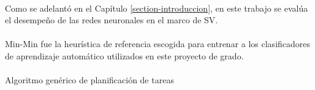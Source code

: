 \paragraph{}Como se adelantó en el Capítulo \ref{section-introduccion}, en este trabajo se evalúa el desempeño de las redes neuronales en el marco de SV.

\paragraph{} Min-Min fue la heurística de referencia escogida para entrenar a los clasificadores de aprendizaje automático utilizados en este proyecto de grado.
 
 
 \paragraph{}
 \SetEndCharOfAlgoLine{}
 \begin{algorithm}[H]
\SetAlgoLined
{}
 \caption{Algoritmo genérico de planificación de tareas} \label{algorithm:planificacion-tareas}
\end{algorithm}